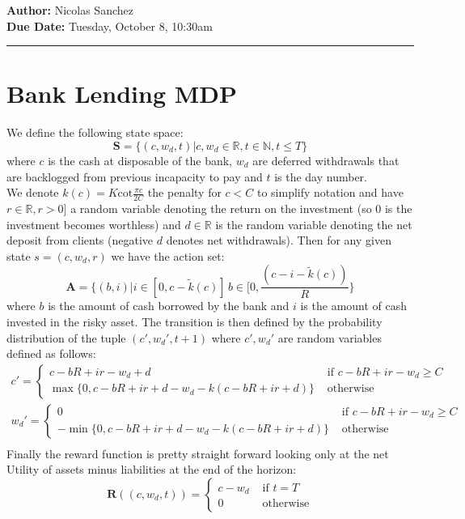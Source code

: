 \documentclass{article}[12pt]
\newcommand{\headings}[4]{\noindent {\bf Assignment 8 CME241} \hfill {{\bf Author:} Nicolas Sanchez} \\
{} \hfill {{\bf Due Date:} #2} \\

\rule[0.1in]{\textwidth}{0.025in}
}
\begin{document}
\headings{\#1}{Tuesday, October 8, 10:30am}\section{} 



\section{Bank Lending MDP}
We define the following state space:
$$\mathbf{S} = \{ (c,w_d,t) | c, w_d \in \mathbb{R}, t\in \mathbb{N}, t \leq T\} $$
where $c$ is the cash at disposable of the bank, $w_d$ are deferred withdrawals that are backlogged from previous incapacity to pay and $t$ is the day number.\\

We denote $k(c) = K\text{cot}\frac{\pi c}{2C}$ the penalty for $c < C$ to simplify notation and have $r\in\mathbb{R}, r>0]$ a random variable denoting the return on the investment (so 0 is the investment becomes worthless) and $d\in\mathbb{R}$ is the random variable denoting the net deposit from clients (negative $d$ denotes net withdrawals). Then for any given state $s = (c,w_d,r)$ we have the action set:
$$ \mathbf{A} = \{ (b,i) | i \in [0,c - \tilde{k}(c)]\, b\in [0, \frac{(c-i-\tilde{k}(c))}{R}\}$$
where $b$ is the amount of cash borrowed by the bank and $i$ is the amount of cash invested in the risky asset. The transition is then defined by the probability distribution of the tuple $(c', w_d',t+1)$ where $c', w_d'$ are random variables defined as follows:
\begin{align*}
c' = \begin{cases} c-bR+ir -w_d + d &\text{ if $c-bR+ir-w_d \geq C$}\\ \max\{0, c-bR+ir+d-w_d -k(c-bR+ir+d)\} & \text{ otherwise}\end{cases}\\
w_d' = \begin{cases} 0 &\text{ if $c-bR+ir-w_d \geq C$} \\ - \min\{0, c-bR+ir+d-w_d -k(c-bR+ir+d)\}& \text{ otherwise} \end{cases}\\
\end{align*}
Finally the reward function is pretty straight forward looking only at the net Utility of assets minus liabilities at the end of the horizon:
$$ \mathbf{R}( (c,w_d, t)) =  \begin{cases} c-w_d &\text{ if $t=T$}\\ 0 & \text{ otherwise}\end{cases}$$
\end{document}

